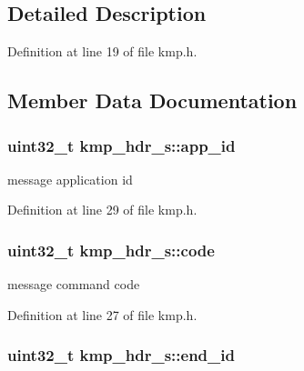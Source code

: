 \subsection{Detailed Description}


Definition at line 19 of file kmp.\-h.



\subsection{Member Data Documentation}
\hypertarget{structkmp__hdr__s_a3aa529d8b4693f2ae937ce94ac0bf560}{
\subsubsection[{app\-\_\-id}]{\setlength{\rightskip}{0pt plus 5cm}uint32\-\_\-t kmp\-\_\-hdr\-\_\-s\-::app\-\_\-id}}\label{structkmp__hdr__s_a3aa529d8b4693f2ae937ce94ac0bf560}


message application id 



Definition at line 29 of file kmp.\-h.

\hypertarget{structkmp__hdr__s_a02a4618b60f6e9f6be45c18bc1b99503}{
\subsubsection[{code}]{\setlength{\rightskip}{0pt plus 5cm}uint32\-\_\-t kmp\-\_\-hdr\-\_\-s\-::code}}\label{structkmp__hdr__s_a02a4618b60f6e9f6be45c18bc1b99503}


message command code 



Definition at line 27 of file kmp.\-h.

\hypertarget{structkmp__hdr__s_a58745a4198eb8e139e3597b2f71ef5ab}{
\subsubsection[{end\-\_\-id}]{\setlength{\rightskip}{0pt plus 5cm}uint32\-\_\-t kmp\-\_\-hdr\-\_\-s\-::end\-\_\-id}}\label{structkmp__hdr__s_a58745a4198eb8e139e3597b2f71ef5ab}


